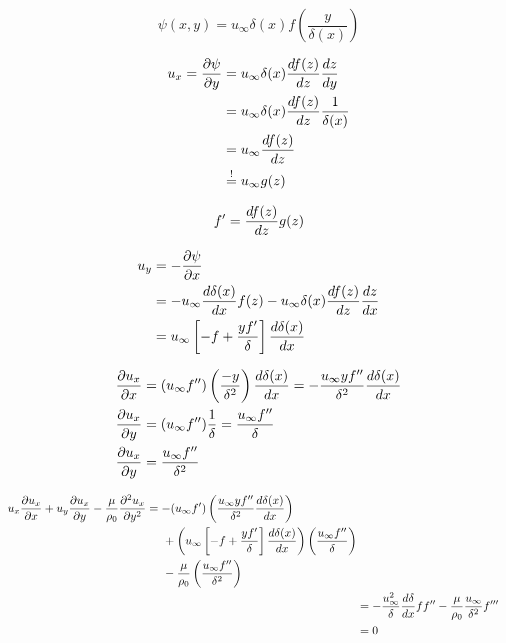 \begin{equation}
\psi(x,y) = u_\infty\delta(x)f\left(\frac{y}{\delta(x)}\right)
\end{equation}

\begin{align}
u_x=\frac{\partial \psi}{\partial y} &= u_\infty\delta(x)\frac{d f(z)}{d z}\frac{d z}{d y} \\
&= u_\infty \delta(x) \frac{d f(z)}{d z}\frac{1}{\delta(x)}\\
&= u_\infty \frac{d f(z)}{d z} \\
&\overset{!}{=} u_\infty g(z)
\end{align}

\begin{equation}
f' = \frac{d f(z)}{d z}g(z)
\end{equation}

\begin{align}
u_y &= -\frac{\partial \psi}{\partial x} \\
&=  -u_\infty\frac{d \delta(x)}{d x}f(z) - u_\infty \delta(x)\frac{d f(z)}{d z}\frac{d z}{d x}\\
&= u_\infty \left[-f + \frac{y f'}{\delta}\right] \frac{d \delta(x)}{d x}
\end{align}

\begin{align}
\frac{\partial u_x}{\partial x} &= \left(u_\infty f''\right)\left(\frac{-y}{\delta^2}\right)\frac{d \delta(x)}{d x} = -\frac{u_\infty y f''}{\delta^2}\frac{d \delta(x)}{d x} \\
\frac{\partial u_x}{\partial y} &= (u_\infty f'') \frac{1}{\delta} = \frac{u_\infty f''}{\delta} \\
\frac{\partial u_x}{\partial y} &= \frac{u_\infty f''}{\delta^2}
\end{align}

\begin{align}
\begin{split}
u_x\frac{\partial u_x}{\partial x} + u_y\frac{\partial u_x}{\partial y} - \frac{\mu}{\rho_0}\frac{\partial^2 u_x}{\partial y^2} &=
-(u_\infty f') \left(\frac{u_\infty y f''}{\delta^2} \frac{d \delta(x)}{d x}\right) \\
&\hspace{5mm} + \left(u_\infty\left[-f+\frac{yf'}{\delta}\right]\frac{d \delta(x)}{d x}\right) \left(\frac{u_\infty f''}{\delta}\right) \\
&\hspace{5mm} -\frac{\mu}{\rho_0} \left(\frac{u_\infty f''}{\delta^2}\right)
\end{split} \\
&= -\frac{u_\infty^2}{\delta}\frac{d \delta}{d x} ff'' - \frac{\mu}{\rho_0} \frac{u_\infty}{\delta^2}f'''\\
&= 0
\end{align}

